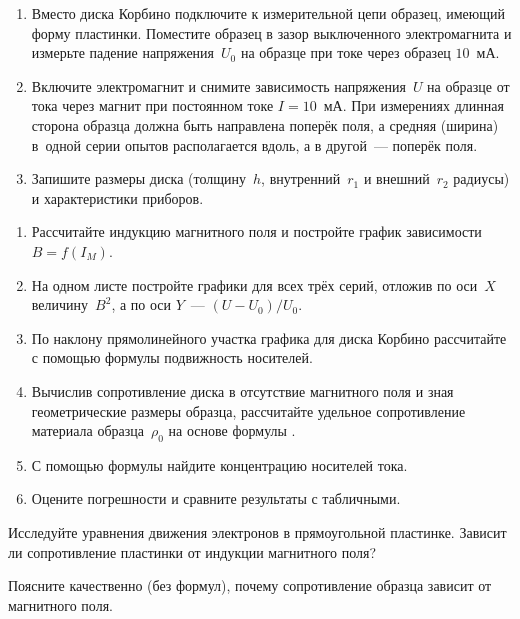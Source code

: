 \begin{lab:task}
\begin{enumerate}
\item{ Вместо диска Корбино подключите к измерительной цепи образец, имеющий
форму пластинки. Поместите образец в зазор выключенного электромагнита и
измерьте падение напряжения~$U_0$ на образце при токе через образец $10$~мА.}

\item{ Включите электромагнит и снимите зависимость напряжения~$U$ на образце от
тока через магнит при постоянном токе $I=10$~мА. При измерениях длинная сторона
образца должна быть направлена поперёк поля, а средняя (ширина) в~одной серии
опытов располагается вдоль, а в другой~--- поперёк поля.}

\item{ Запишите размеры диска (толщину~$h$, внутренний~$r_1$  и внешний~$r_2$
радиусы) и характеристики приборов.}
\end{enumerate}

\begin{enumerate}

\item { Рассчитайте индукцию магнитного поля и постройте график зависимости
$B=f(I_{M})$.}

\item { На одном листе постройте графики для всех трёх серий, отложив по оси~$X$
величину~$B^2$, а по оси $Y$~--- $(U-U_0)/U_0$.}

\item { По наклону прямолинейного участка графика для диска Корбино рассчитайте
с помощью формулы  подвижность носителей.}

\item { Вычислив сопротивление диска в отсутствие магнитного поля и зная
геометрические размеры образца, рассчитайте удельное сопротивление материала
образца~$\rho_0$ на основе формулы .}

\item {С помощью формулы  найдите концентрацию носителей
тока.}

\item { Оцените погрешности и сравните результаты с табличными.}
\end{enumerate}
\end{lab:task}

\begin{lab:questions}

\item{ Исследуйте уравнения движения электронов в прямоугольной пластинке.
Зависит ли сопротивление пластинки от индукции магнитного поля?}

\item{ Поясните качественно (без формул), почему сопротивление образца зависит
от магнитного поля.}
\end{lab:questions}

